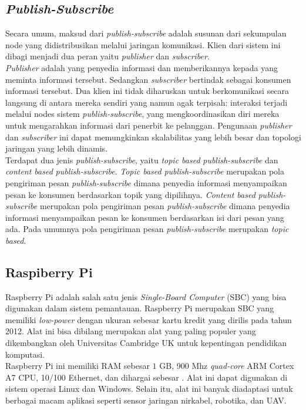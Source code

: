 \subsection{\textit{Publish-Subscribe}}
\tab Secara umum, maksud dari \textit{publish-subscribe} adalah susunan dari sekumpulan node yang didistribusikan melalui jaringan komunikasi. Klien dari sistem ini dibagi menjadi dua peran yaitu \textit{publisher} dan \textit{subscriber}.\\
\tab \textit{Publisher} adalah yang penyedia informasi dan memberikannya kepada yang meminta informasi tersebut. Sedangkan \textit{subscriber} bertindak sebagai konsumen informasi tersebut. Dua klien ini tidak diharuskan untuk berkomunikasi secara langsung di antara mereka sendiri yang namun agak terpisah: interaksi terjadi melalui nodes sistem \textit{publish-subscribe}, yang mengkoordinasikan diri mereka untuk mengarahkan informasi dari penerbit ke pelanggan. Pengunaan \textit{publisher} dan \textit{subscriber} ini dapat memungkinkan skalabilitas yang lebih besar dan topologi jaringan yang lebih dinamis.\\
\tab Terdapat dua jenis \textit{publish-subscribe}, yaitu \textit{topic based} \textit{publish-subscribe} dan \textit{content based} \textit{publish-subscribe}. \textit{Topic based} \textit{publish-subscribe} merupakan pola pengiriman pesan \textit{publish-subscribe} dimana penyedia informasi menyampaikan pesan ke konsumen berdasarkan topik yang dipilihnya. \textit{Content based} \textit{publish-subscribe} merupakan pola pengiriman pesan \textit{publish-subscribe} dimana penyedia informasi menyampaikan pesan ke konsumen berdasarkan isi dari pesan yang ada. Pada umumnya pola pengiriman pesan \textit{publish-subscribe} merupakan \textit{topic based}.


\subsection{Raspiberry Pi}
\tab Raspberry Pi adalah salah satu jenis \textit{Single-Board Computer} (SBC) yang bisa digunakan dalam sistem pemantauan. Raspberry Pi merupakan SBC yang memiliki \textit{low-power} dengan ukuran sebesar kartu kredit yang dirilis pada tahun 2012. Alat ini bisa dibilang merupakan alat yang paling populer yang dikembangkan oleh Universitas Cambridge UK untuk kepentingan pendidikan komputasi.\\
\tab Raspberry Pi ini memiliki RAM sebesar $1$ GB, 900 Mhz \textit{quad-core} ARM Cortex A7 CPU, 10/100 Ethernet, dan dihargai sebesar . Alat ini dapat digunakan di sistem operasi Linux dan Windows. Selain itu, alat ini banyak diadaptasi untuk berbagai macam aplikasi seperti sensor jaringan nirkabel, robotika, dan UAV.


